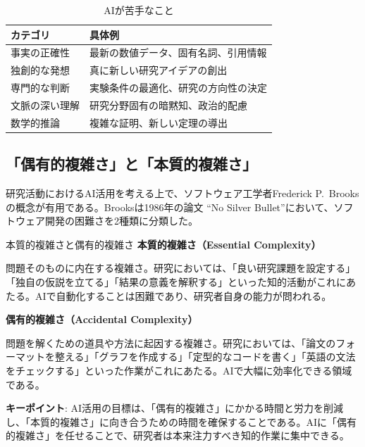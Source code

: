 \begin{table}[htbp]
\centering
\caption{AIが苦手なこと}
\label{tab:ai_weaknesses}
\begin{tabular}{ll}
\toprule
カテゴリ & 具体例 \\
\midrule
事実の正確性 & 最新の数値データ、固有名詞、引用情報 \\
独創的な発想 & 真に新しい研究アイデアの創出 \\
専門的な判断 & 実験条件の最適化、研究の方向性の決定 \\
文脈の深い理解 & 研究分野固有の暗黙知、政治的配慮 \\
数学的推論 & 複雑な証明、新しい定理の導出 \\
\bottomrule
\end{tabular}
\end{table}

\subsection{「偶有的複雑さ」と「本質的複雑さ」}

研究活動におけるAI活用を考える上で、ソフトウェア工学者Frederick P.\ Brooksの概念が有用である。Brooksは1986年の論文 ``No Silver Bullet''\cite{Brooks1986}において、ソフトウェア開発の困難さを2種類に分類した。

\begin{itembox}[l]{本質的複雑さと偶有的複雑さ}
\textbf{本質的複雑さ（Essential Complexity）}

問題そのものに内在する複雑さ。研究においては、「良い研究課題を設定する」「独自の仮説を立てる」「結果の意義を解釈する」といった知的活動がこれにあたる。AIで自動化することは困難であり、研究者自身の能力が問われる。

\vspace{3mm}
\textbf{偶有的複雑さ（Accidental Complexity）}

問題を解くための道具や方法に起因する複雑さ。研究においては、「論文のフォーマットを整える」「グラフを作成する」「定型的なコードを書く」「英語の文法をチェックする」といった作業がこれにあたる。AIで大幅に効率化できる領域である。
\end{itembox}

\begin{screen}
\textbf{キーポイント}: AI活用の目標は、「偶有的複雑さ」にかかる時間と労力を削減し、「本質的複雑さ」に向き合うための時間を確保することである。AIに「偶有的複雑さ」を任せることで、研究者は本来注力すべき知的作業に集中できる。
\end{screen}

